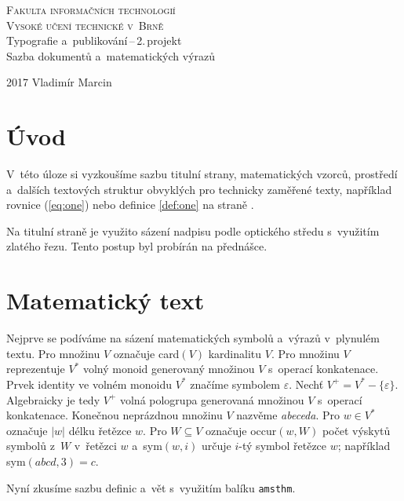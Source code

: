 \documentclass[11pt,a4paper,twocolumn,titlepage]{article}
\theoremstyle{definition}
\theoremstyle{plain}
\begin{document}
\begin{titlepage}
	\begin{center}
		{\Huge\textsc{Fakulta informačních technologií}} \\ \smallskip
		{\Huge\textsc{Vysoké učení technické v~Brně}} \\
		{\LARGE{Typografie a~publikování\,--\,2.\,projekt}} \\ \smallskip
		{\LARGE{Sazba dokumentů a~matematických výrazů}} \\
	\end{center}
	 {\Large {2017} \hfill {Vladimír Marcin}}
\end{titlepage}
\section*{Úvod}
V~této úloze si vyzkoušíme sazbu titulní strany, matematických vzorců, prostředí a~dalších textových struktur obvyklých 
pro technicky zaměřené texty, například rovnice (\ref{eq:one}) nebo definice \ref{def:one} na straně \pageref{def:one}.

Na titulní straně je využito sázení nadpisu podle optického středu s~využitím zlatého řezu. Tento postup byl probírán na přednášce.
\section{Matematický text}
Nejprve se podíváme na sázení matematických symbolů a~výrazů v~plynulém textu. Pro množinu $V$ označuje card$(V)$ kardinalitu $V$.
Pro množinu $V$ reprezentuje $V^*$ volný monoid generovaný množinou $V$ s~operací konkatenace.
Prvek identity ve volném monoidu $V^*$ značíme symbolem $\varepsilon$.
Nechť $V^+=V^*-\{\varepsilon\}$. Algebraicky je tedy $V^+$ volná pologrupa generovaná množinou $V$ s~operací konkatenace.
Konečnou neprázdnou množinu $V$ nazvěme \emph{abeceda}.
Pro $w \in V^*$ označuje $|w|$ délku řetězce $w$. Pro $W \subseteq V$ označuje occur$(w,W)$ počet výskytů symbolů z~$W$ v~řetězci $w$ 
a~sym$(w,i)$ určuje $i$-tý symbol řetězce $w$; například sym$(abcd,3)=c$.

Nyní zkusíme sazbu definic a~vět s~využitím balíku \texttt{amsthm}.
\end{document}

